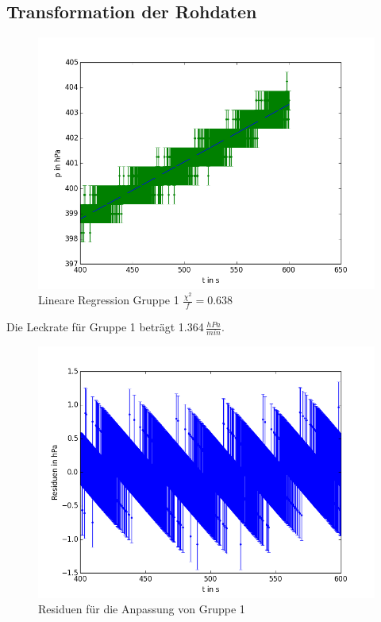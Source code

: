\documentclass[11pt]{beamer}
\begin{document}
\subsection{Transformation der Rohdaten}
\begin{frame}
\begin{figure}[H]
\centering
\includegraphics[scale=0.5]{Bilder/dichtigkeit__JM.png}
\caption{Lineare Regression Gruppe 1 $\frac{\chi^2}{f}=0.638$}
\end{figure}
Die Leckrate für Gruppe 1 beträgt 1.364$\,\frac{hPa}{min}$.
\end{frame}

\begin{frame}
\begin{figure}[H]
\centering
\includegraphics[scale=0.5]{Bilder/residuen_dichtigkeit_JM.png}
\caption{Residuen für die Anpassung von Gruppe 1}
\end{figure}
\end{frame}
\end{document}
